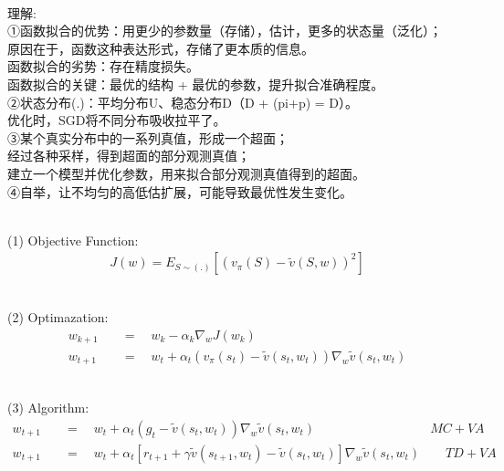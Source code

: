 \documentclass{article}
\begin{document}
~ \\[3pt]
\begin{CJK}{UTF8}{gbsn}
    理解: \\[3pt]
    ①函数拟合的优势：用更少的参数量（存储），估计，更多的状态量（泛化）； \\[3pt]
    原因在于，函数这种表达形式，存储了更本质的信息。 \\[3pt]
    函数拟合的劣势：存在精度损失。 \\[3pt]
    函数拟合的关键：最优的结构 + 最优的参数，提升拟合准确程度。 \\[3pt]
    ②状态分布(.)：平均分布U、稳态分布D（D + (pi+p) = D）。 \\[3pt]
    优化时，SGD将不同分布吸收拉平了。 \\[3pt]
    ③某个真实分布中的一系列真值，形成一个超面； \\[3pt]
    经过各种采样，得到超面的部分观测真值； \\[3pt]
    建立一个模型并优化参数，用来拟合部分观测真值得到的超面。 \\[3pt]
    ④自举，让不均匀的高低估扩展，可能导致最优性发生变化。 \\[3pt]
\end{CJK}


~ \\[3pt]
(1) Objective Function: 
\begin{align*}
    J(w) = E_{S \sim (.)} 
           [ (v_{\pi}(S) - \tilde{v}(S, w) )^2 ] 
\end{align*}

~ \\[3pt]
(2) Optimazation: 
\begin{align*}
    w_{k+1} & 
            \quad = \quad w_{k} - \alpha_{k} 
            \nabla_{w} J(w_{k}) \\[3pt]
    w_{t+1} & 
            \quad = \quad w_{t} + \alpha_{t} 
            (v_{\pi}(s_{t}) - \tilde{v}(s_{t}, w_{t})) 
            \nabla_{w} \tilde{v}(s_{t}, w_{t}) 
\end{align*}

~ \\[3pt]
(3) Algorithm: 
\begin{align*}
    w_{t+1} & 
            \quad = \quad w_{t} + \alpha_{t} 
            (g_{t} - \tilde{v}(s_{t}, w_{t})) 
            \nabla_{w} \tilde{v}(s_{t}, w_{t}) 
            \qquad \qquad \qquad \qquad \quad MC+VA \\[3pt]
    w_{t+1} & 
            \quad = \quad w_{t} + \alpha_{t} 
            [r_{t+1} + \gamma \tilde{v}(s_{t+1}, w_{t}) 
            - \tilde{v}(s_{t}, w_{t})] 
            \nabla_{w} \tilde{v}(s_{t}, w_{t}) 
            \qquad TD+VA 
\end{align*}
\end{document}
